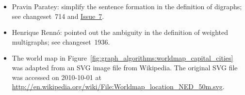 \begin{itemize}
\item Pravin Paratey: simplify the sentence formation in the definition
  of digraphs; see changeset~714 and
  \href{http://code.google.com/p/graph-theory-algorithms-book/issues/detail?id=7}{Issue~7}.

\item Henrique Renn\'o: pointed out the ambiguity in the definition of
  weighted multigraphs; see changeset~1936.

\item The world map in
  Figure~\ref{fig:graph_algorithms:worldmap_capital_cities} was
  adapted from an SVG image file from Wikipedia. The original SVG file
  was accessed on 2010-10-01 at
  \url{http://en.wikipedia.org/wiki/File:Worldmap_location_NED_50m.svg}.
\end{itemize}
